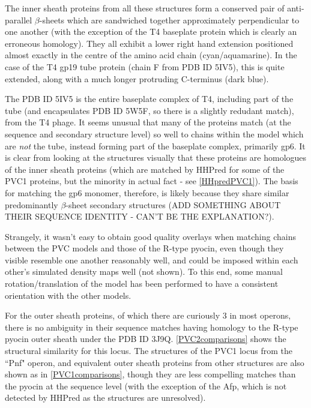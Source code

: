 The inner sheath proteins from all these structures form a conserved pair of anti-parallel $\beta$-sheets which are sandwiched together approximately perpendicular to one another (with the exception of the T4 baseplate protein which is clearly an erroneous homology). They all exhibit a lower right hand extension positioned almost exactly in the centre of the amino acid chain (cyan/aquamarine). In the case of the T4 gp19 tube protein (chain F from PDB ID 5IV5), this is quite extended, along with a much longer protruding C-terminus (dark blue).

The PDB ID 5IV5 is the entire baseplate complex of T4, including part of the tube (and encapsulates PDB ID 5W5F, so there is a slightly redudant match), from the T4 phage. It seems unusual that many of the proteins match (at the sequence and secondary structure level) so well to chains within the model which are \emph{not} the tube, instead forming part of the baseplate complex, primarily gp6. It is clear from looking at the structures visually that these proteins are homologues of the inner sheath proteins (which are matched by HHPred for some of the PVC1 proteins, but the minority in actual fact - see \vref{HHpredPVC1}). The basis for matching the gp6 monomer, therefore, is likely because they share similar predominantly $\beta$-sheet secondary structures (ADD SOMETHING ABOUT THEIR SEQUENCE IDENTITY - CAN'T BE THE EXPLANATION?).

Strangely, it wasn't easy to obtain good quality overlays when matching chains between the PVC models and those of the R-type pyocin, even though they visible resemble one another reasonably well, and could be imposed within each other's simulated density maps well (not shown). To this end, some manual rotation/translation of the model has been performed to have a consistent orientation with the other models.

For the outer sheath proteins, of which there are curiously 3 in most operons, there is no ambiguity in their sequence matches having homology to the R-type pyocin outer sheath under the PDB ID 3J9Q. \vref{PVC2comparisons} shows the structural similarity for this locus. The structures of the PVC1 locus from the ``Pnf" operon, and equivalent outer sheath proteins from other structures are also shown as in \vref{PVC1comparisons}, though they are less compelling matches than the pyocin at the sequence level (with the exception of the Afp, which is not detected by HHPred as the structures are unresolved).



